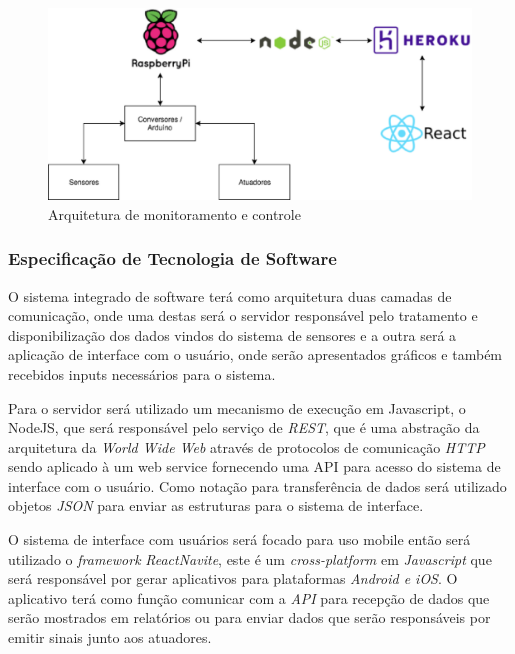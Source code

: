 \begin{figure}[h]
 \centering
 \includegraphics[keepaspectratio=true,scale=0.5]{figuras/arquitetura.eps}
 \caption{Arquitetura de monitoramento e controle}
 \label{arquitetura}
\end{figure}

\subsubsection{Especificação de Tecnologia de Software}

O sistema integrado de software terá como arquitetura duas camadas de comunicação, onde uma destas será o servidor responsável pelo tratamento e disponibilização dos dados vindos do sistema de sensores e a outra será a aplicação de interface com o usuário, onde serão apresentados gráficos e também recebidos inputs necessários para o sistema.

Para o servidor será utilizado um mecanismo de execução em Javascript, o NodeJS, que será responsável pelo serviço de \textit{REST}, que é uma abstração da arquitetura da \textit{World Wide Web} através de protocolos de comunicação \textit{HTTP} sendo aplicado à um web service fornecendo uma API para acesso do sistema de interface com o usuário. Como notação para transferência de dados será utilizado objetos \textit{JSON} para enviar as estruturas para o sistema de interface.

O sistema de interface com usuários será focado para uso mobile então será utilizado o \textit{framework} \textit{ReactNavite}, este é um \textit{cross-platform} em \textit{Javascript} que será responsável por gerar aplicativos para plataformas \textit{Android e iOS}. O aplicativo terá como função comunicar com a \textit{API} para recepção de dados que serão mostrados em relatórios ou para enviar dados que serão responsáveis por emitir sinais junto aos atuadores.
